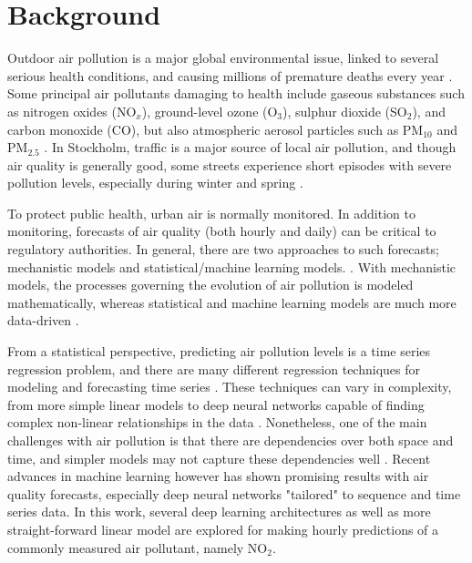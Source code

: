 
\section{Background}

Outdoor air pollution is a major global environmental issue, linked to several serious health conditions, and causing millions of premature deaths every year \cite{who2016}. Some principal air pollutants damaging to health include gaseous substances such as nitrogen oxides (NO$_x$), ground-level ozone (O$_3$), sulphur dioxide (SO$_2$), and carbon monoxide (CO), but also atmospheric aerosol particles such as PM$_{10}$ and PM$_{2.5}$ \cite{VanLoon2010}. In Stockholm, traffic is a major source of local air pollution, and though air quality is generally good, some streets experience short episodes with severe pollution levels, especially during winter and spring \cite{slbanalys}. %

To protect public health, urban air is normally monitored. In addition to monitoring, forecasts of air quality (both hourly and daily) can be critical to regulatory authorities. In general, there are two approaches to such forecasts; mechanistic models and statistical/machine learning models. \cite{ElHarbawi2013, Liao2020, atmos7020015}. %
With mechanistic models, the processes governing the evolution of air pollution is modeled mathematically, whereas statistical and machine learning models are much more data-driven \cite{atmos7020015}. 

From a statistical perspective, predicting air pollution levels is a time series regression problem, and there are many different regression techniques for modeling and forecasting time series \cite{atmos7020015}. These techniques can vary in complexity, from more simple linear models to deep neural networks capable of finding complex non-linear relationships in the data \cite{atmos7020015, LeCun2015}. Nonetheless, one of the main challenges with air pollution is that there are dependencies over both space and time, and simpler models may not capture these dependencies well \cite{Liao2020}. Recent advances in machine learning however has shown promising results with air quality forecasts, especially deep neural networks "tailored" to sequence and time series data\cite{Liao2020, atmos7020015}. In this work, several deep learning architectures as well as more straight-forward linear model are explored for making hourly predictions of a commonly measured air pollutant, namely NO$_2$.  

